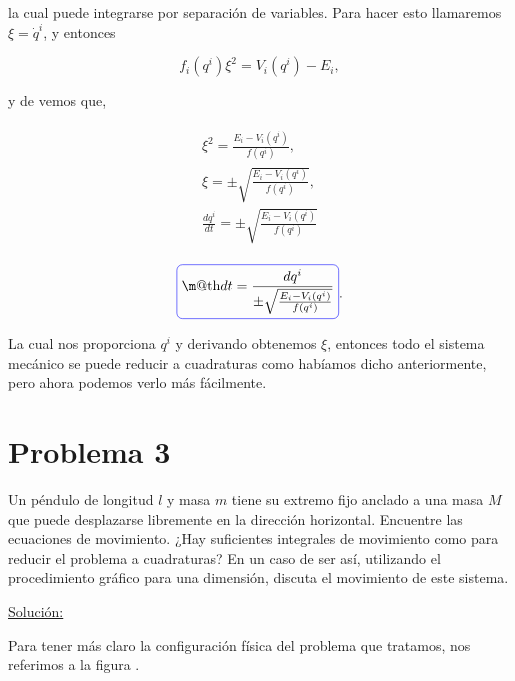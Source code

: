 \documentclass[a4paper,10pt]{article}
\makeatletter
\numberwithin{equation}{section}
\newcommand*{\boxcolor}{blue}
\renewcommand{\boxed}[1]{\textcolor{\boxcolor}{%
\tikz[baseline={([yshift=-1ex]current bounding box.center)}] \node [rectangle, minimum width=1ex,rounded corners,draw] {\normalcolor\m@th$\displaystyle#1$};}}
\makeatother
\begin{document}
la cual puede integrarse por separación de variables. Para hacer esto llamaremos 
$\xi = \dot{q}^i$, y entonces 

\begin{equation}
 f_i(q^i) \xi^2 = V_i(q^i) - E_i,
 \label{eq:3diferencial}
\end{equation}

y de  vemos que,

\begin{align}
 \begin{split}
  \xi^2 = \frac{E_i - V_i(q^i)}{f(q^i)}, \\
  \xi = \pm \sqrt{\frac{E_i - V_i(q^i)}{f(q^i)}}, \\
  \frac{dq^i}{dt} = \pm \sqrt{\frac{E_i - V_i(q^i)}{f(q^i)}}
 \end{split}
\end{align}

\begin{equation}
 \boxed{dt = \frac{dq^i}{\pm \sqrt{\frac{E_i - V_i(q^i)}{f(q^i)}}}}.
 \label{eq:3final}
\end{equation}

La cual nos proporciona $q^i$ y derivando obtenemos $\xi$, entonces todo el sistema 
mecánico se puede reducir a cuadraturas como habíamos dicho anteriormente, pero ahora 
podemos verlo más fácilmente.

\section{Problema 3}

Un péndulo de longitud $l$ y masa $m$ tiene su extremo fijo anclado a una masa $M$ que 
puede desplazarse libremente en la dirección horizontal. Encuentre las ecuaciones de 
movimiento. ¿Hay suficientes integrales de movimiento como para reducir el problema 
a cuadraturas? En un caso de ser así, utilizando el procedimiento gráfico para una 
dimensión, discuta el movimiento de este sistema.

\vspace{.3cm}

\underline{Solución:} \vspace{.3cm}

Para tener más claro la configuración física del problema que tratamos, nos referimos 
a la figura .
\end{document}
